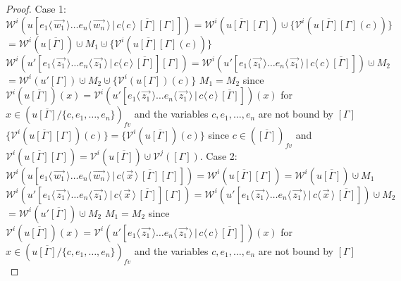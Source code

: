 \documentclass[a4paper,UKenglish,cleveref, autoref]{lipics-v2019}
\newcommand{\fv}[1]{(#1)_{fv}}
\newcommand{\set}[1]{ \{ #1 \} }
\newcommand{\dist}[5]{#1 [ #2 \, \vert \, \fakedist{#4}{#5} \, #3 ]}
\newcommand{\fakedist}[2]{#1 \langle \, #2 \, \rangle}
\newcommand{\weight}[2]{\mathcal{W}^{#1}(#2)}
\newcommand{\weightvar}[2]{\mathcal{V}^{#1}(#2)}
\begin{document}
\begin{proof}
Case 1:
\newline
$\weight{i}{\dist{u}{\fakedist{e_{1}}{\vec{w_{1}}} \dots \fakedist{e_{n}}{\vec{w_{n}}}}{\overline{[\Gamma]} [\Gamma]}{c}{c}} = \weight{i}{u \overline{[\Gamma]}[\Gamma]} \cupdot \set{\weightvar{i}{u\overline{[\Gamma]}[\Gamma](c)}}$
\newline
$= \weight{i}{u\overline{[\Gamma]}} \cupdot M_{1} \cupdot  \set{\weightvar{i}{u\overline{[\Gamma]}[\Gamma](c)}}$
\newline
$\weight{i}{\dist{u'}{\fakedist{e_{1}}{\vec{z_{1}}} \dots \fakedist{e_{n}}{\vec{z_{1}}}}{\overline{[\Gamma]}}{c}{c}[\Gamma]} = \weight{i}{\dist{u'}{\fakedist{e_{1}}{\vec{z_{1}}} \dots \fakedist{e_{n}}{\vec{z_{1}}}}{\overline{[\Gamma]}}{c}{c}} \cupdot M_{2}$
\newline
$= \weight{i}{u'[\Gamma]} \cupdot M_{2} \cupdot \set{\weightvar{i}{u[\Gamma]}(c)}$
\newline
$M_{1} = M_{2}$ since $\weightvar{i}{u \overline{[\Gamma]}}(x) = \weightvar{i}{\dist{u'}{\fakedist{e_{1}}{\vec{z_{1}}} \dots \fakedist{e_{n}}{\vec{z_{1}}}}{\overline{[\Gamma]}}{c}{c}}(x)$
\newline
for $x \in \fv{u \overline{[\Gamma]} / \set{c, e_{1}, \dots, e_{n}}}$ and the variables $c, e_{1}, \dots, e_{n}$ are not bound by $[\Gamma]$
\newline
$\set{\weightvar{i}{u\overline{[\Gamma]}[\Gamma]}(c)} =  \set{\weightvar{i}{u\overline{[\Gamma]}}(c)}$ since $c \in \fv{\overline{[\Gamma]}}$ and $\weightvar{i}{u\overline{[\Gamma]}[\Gamma]} = \weightvar{i}{u\overline{[\Gamma]}} \cupdot \weightvar{j}{[\Gamma]}$.
\newline
Case 2:
\newline
$\weight{i}{\dist{u}{\fakedist{e_{1}}{\vec{w_{1}}} \dots \fakedist{e_{n}}{\vec{w_{n}}}}{\overline{[\Gamma]} [\Gamma]}{c}{\vec{x}}} = \weight{i}{u\overline{[\Gamma]}[\Gamma]} = \weight{i}{u\overline{[\Gamma]}} \cupdot M_{1}$
\newline
$\weight{i}{\dist{u'}{\fakedist{e_{1}}{\vec{z_{1}}} \dots \fakedist{e_{n}}{\vec{z_{1}}}}{\overline{[\Gamma]}}{c}{\vec{x}}[\Gamma]} = \weight{i}{\dist{u'}{\fakedist{e_{1}}{\vec{z_{1}}} \dots \fakedist{e_{n}}{\vec{z_{1}}}}{\overline{[\Gamma]}}{c}{\vec{x}}} \cupdot M_{2}$
\newline
$= \weight{i}{u'\overline{[\Gamma]}} \cupdot M_{2}$
\newline
$M_{1} = M_{2}$ since $\weightvar{i}{u \overline{[\Gamma]}}(x) = \weightvar{i}{\dist{u'}{\fakedist{e_{1}}{\vec{z_{1}}} \dots \fakedist{e_{n}}{\vec{z_{1}}}}{ \overline{[\Gamma]}}{c}{c}}(x)$
\newline
for $x \in \fv{u \overline{[\Gamma]} / \set{c, e_{1}, \dots, e_{n}}}$ and the variables $c, e_{1}, \dots, e_{n}$ are not bound by $[\Gamma]$
\end{proof}
\end{document}
